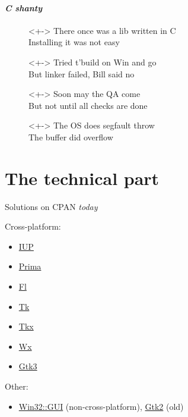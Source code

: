 \begin{frame}
	\paragraph{\emph{C shanty}}
	\begin{description}
		\item[]<+-> There once was a lib written in C \\
			Installing it was not easy
		\item[]<+-> Tried t'build on Win and go \\
			But linker failed, Bill said no
		\item[]<+-> Soon may the QA come \\
			But not until all checks are done
		\item[]<+-> The OS does segfault throw \\
			The buffer did overflow
	\end{description}
\end{frame}

\section{The technical part}
\begin{frame}{Solutions on CPAN \emph{today}}
\protect\hypertarget{gui-toolkits-on-cpan}{}

Cross-platform:

\begin{itemize}
\tightlist
\item
  \href{https://metacpan.org/pod/IUP}{IUP}
\item
  \href{https://metacpan.org/pod/Prima}{Prima}
\item
  \href{https://metacpan.org/pod/Fl}{Fl}
\item
  \href{https://metacpan.org/pod/Tk}{Tk}
\item
  \href{https://metacpan.org/pod/Tkx}{Tkx}
\item
  \href{https://metacpan.org/pod/Wx}{Wx}
\item
  \href{https://metacpan.org/pod/Gtk3}{Gtk3}
\end{itemize}

Other:

\begin{itemize}
\tightlist
\item
  \href{https://metacpan.org/pod/Win32::GUI}{Win32::GUI} (non-cross-platform),
  \href{https://metacpan.org/pod/Gtk2}{Gtk2} (old)
\end{itemize}

\end{frame}

